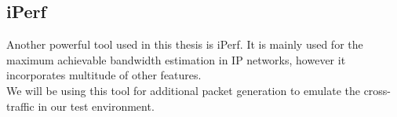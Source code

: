 \subsection*{iPerf}
Another powerful tool used in this thesis is iPerf\cite{iperf}. It is mainly used for the maximum achievable bandwidth estimation in IP networks, however it incorporates multitude of other features.\\
We will be using this tool for additional packet generation to emulate the cross-traffic in our test environment.

